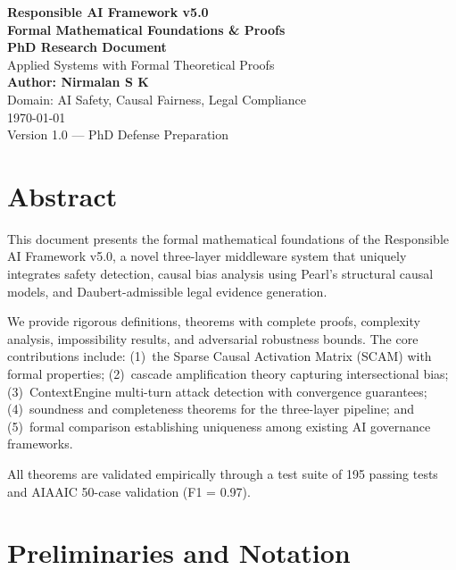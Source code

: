 \documentclass[12pt,a4paper]{report}
\theoremstyle{plain}
\theoremstyle{definition}
\theoremstyle{remark}
\begin{document}
\begin{titlepage}
\centering
\vspace*{2cm}
{\Huge\bfseries Responsible AI Framework v5.0\\[0.5cm]}
{\Huge\bfseries Formal Mathematical Foundations \& Proofs\\[2cm]}
{\Large\bfseries PhD Research Document\\[0.5cm]}
{\large Applied Systems with Formal Theoretical Proofs\\[2cm]}
{\large\bfseries Author: Nirmalan S K\\[0.5cm]}
{\large Domain: AI Safety, Causal Fairness, Legal Compliance\\[1cm]}
\vfill
{\large\today\\[0.3cm]}
{\large Version 1.0 --- PhD Defense Preparation}
\end{titlepage}

\chapter*{Abstract}

This document presents the formal mathematical foundations
of the Responsible AI Framework v5.0, a novel three-layer
middleware system that uniquely integrates safety detection,
causal bias analysis using Pearl's structural causal models,
and Daubert-admissible legal evidence generation.

We provide rigorous definitions, theorems with complete
proofs, complexity analysis, impossibility results, and
adversarial robustness bounds. The core contributions
include: (1)~the Sparse Causal Activation Matrix (SCAM)
with formal properties; (2)~cascade amplification theory
capturing intersectional bias; (3)~ContextEngine multi-turn
attack detection with convergence guarantees;
(4)~soundness and completeness theorems for the three-layer
pipeline; and (5)~formal comparison establishing uniqueness
among existing AI governance frameworks.

All theorems are validated empirically through a test suite
of 195 passing tests and AIAAIC 50-case validation (F1 = 0.97).

\tableofcontents
\listoftables

\chapter{Preliminaries and Notation}
\label{ch:prelim}
\end{document}
